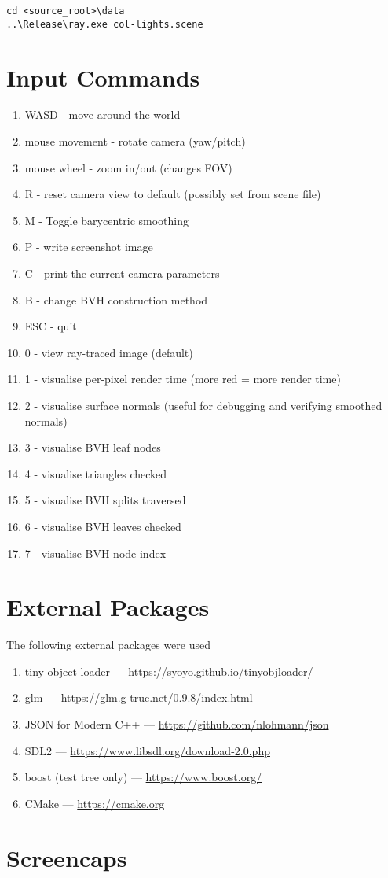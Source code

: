 \verb|cd <source_root>\data| \\
\verb|..\Release\ray.exe col-lights.scene|

\section{Input Commands}
    \begin{enumerate}
    \item WASD - move around the world
    \item mouse movement - rotate camera (yaw/pitch)
    \item mouse wheel - zoom in/out (changes FOV)
    \item R - reset camera view to default (possibly set from scene file)
    \item M - Toggle barycentric smoothing
    \item P - write screenshot image
    \item C - print the current camera parameters
    \item B - change BVH construction method
    \item ESC - quit
    \item 0 - view ray-traced image (default)
    \item 1 - visualise per-pixel render time (more red = more render time)
    \item 2 - visualise surface normals (useful for debugging and verifying smoothed normals)
    \item 3 - visualise BVH leaf nodes
    \item 4 - visualise triangles checked
    \item 5 - visualise BVH splits traversed
    \item 6 - visualise BVH leaves checked 
    \item 7 - visualise BVH node index
    \end{enumerate}

\section{External Packages}
The following external packages were used 
\begin{enumerate}
    \item tiny object loader --- \url{https://syoyo.github.io/tinyobjloader/}
    \item glm --- \url{https://glm.g-truc.net/0.9.8/index.html}
    \item JSON for Modern C++ --- \url{https://github.com/nlohmann/json}
    \item SDL2 --- \url{https://www.libsdl.org/download-2.0.php}
    \item boost (test tree only) --- \url{https://www.boost.org/}
    \item CMake --- \url{https://cmake.org}
\end{enumerate}

\section{Screencaps}

